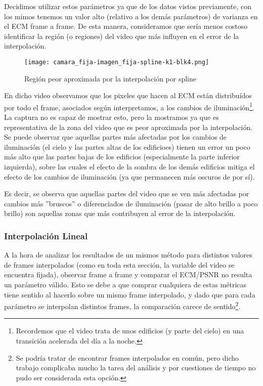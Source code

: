 \par Decidimos utilizar estos par\'ametros ya que de los datos vistos
previamente, con los mimos tenemos un valor alto (relativo a los dem\'as
par\'ametros) de varianza en el ECM frame a frame. De esta manera, consideramos
que ser\'ia menos costoso identificar la regi\'on (o regiones) del video que
m\'as influyen en el error de la interpolaci\'on.

\begin{figure}[H]
    \centering
    \texttt{[image: camara\_fija-imagen\_fija-spline-k1-blk4.png]}
    \label{fig:fija-fija_spline-heatmap}
    \caption{Regi\'on peor aproximada por la interpolaci\'on por spline}
\end{figure}

\par En dicho video observamos que los pixeles que hacen al ECM est\'an
distribu\'idos por todo el frame, asociados seg\'un interpretamos, a los
cambios de iluminaci\'on\footnote{Recordemos que el video trata de unos
edificios (y parte del cielo) en una transici\'on acelerada del d\'ia a la
noche.}. La captura no es capaz de mostrar esto, pero la mostramos ya que es
representativa de la zona del video que es peor aproximada por la
interpolaci\'on. Se puede observar que aquellas partes m\'as afectadas por los
cambios de iluminaci\'on (el cielo y las partes altas de los edificioes) tienen
un error un poco m\'as alto que las partes bajas de los edificios
(especialmente la parte inferior izquierda), sobre las cuales el efecto de la
sombra de los dem\'as edificios mitiga el efecto de los cambios de
iluminaci\'on (ya que permanecen m\'as oscuros de por s\'i).

\par Es decir, se observa que aquellas partes del video que se ven m\'as
afectadas por cambios m\'as ''bruscos'' o diferenciados de iluminaci\'on (pasar
de alto brillo a poco brillo) son aquellas zonas que m\'as contribuyen al error
de la interpolaci\'on.

\subsubsection{Interpolaci\'on Lineal}
\par A la hora de analizar los resultados de un mismos m\'etodo para distintos
valores de frames interpolados (como en toda esta secci\'on, la variable del
video se encuentra fijada), observar frame a frame y comparar el ECM/PSNR no
resulta un par\'ametro v\'alido. Esto se debe a que comprar cualquiera de estas
m\'etricas tiene sentido al hacerlo sobre un mismo frame interpolado, y dado que
para cada par\'ametro se interpolan distintos frames, la comparaci\'on carece
de sentido\footnote{Se podr\'ia tratar de encontrar frames interpolados en
com\'un, pero dicho trabajo complicaba mucho la tarea del an\'alisis y por
cuestiones de tiempo no pudo ser considerada esta opci\'on.}.

